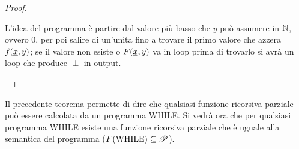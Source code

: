 \begin{proof}
\begin{enumerate}
        \begin{minipage}{.52\textwidth}
        \begin{tcolorbox}[colback=white,sharp corners,boxrule=.2mm]
        \end{tcolorbox}
        \end{minipage}\hfill
        \begin{minipage}{.37\textwidth}
            L'idea del programma è partire dal valore più basso che $y$ può assumere
            in $\mathbb{N}$, ovvero 0, per poi salire di un'unita fino a trovare il primo valore 
            che azzera $f(\text{\underline{$x$}},y)$; se il valore non esiste o $F(\text{\underline{$x$}},y)$
            va in loop prima di trovarlo si avrà un loop che produce $\perp$ in output.
        \end{minipage}
    \end{enumerate} 
\end{proof}
Il precedente teorema permette di dire che qualsiasi funzione ricorsiva parziale può essere
calcolata da un programma WHILE. Si vedrà ora che per qualsiasi programma WHILE esiste una
funzione ricorsiva parziale che è uguale alla semantica del programma 
($F(\text{WHILE}) \subseteq \mathscr{P}$).

